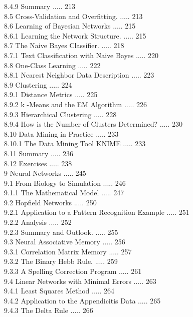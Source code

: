 \documentclass[10pt]{article}
\begin{document}
8.4.9 Summary ..... 213\\
8.5 Cross-Validation and Overfitting. ..... 213\\
8.6 Learning of Bayesian Networks ..... 215\\
8.6.1 Learning the Network Structure. ..... 215\\
8.7 The Naive Bayes Classifier. ..... 218\\
8.7.1 Text Classification with Naive Bayes ..... 220\\
8.8 One-Class Learning ..... 222\\
8.8.1 Nearest Neighbor Data Description ..... 223\\
8.9 Clustering ..... 224\\
8.9.1 Distance Metrics ..... 225\\
8.9.2 k -Means and the EM Algorithm ..... 226\\
8.9.3 Hierarchical Clustering ..... 228\\
8.9.4 How is the Number of Clusters Determined? ..... 230\\
8.10 Data Mining in Practice ..... 233\\
8.10.1 The Data Mining Tool KNIME ..... 233\\
8.11 Summary ..... 236\\
8.12 Exercises ..... 238\\
9 Neural Networks ..... 245\\
9.1 From Biology to Simulation ..... 246\\
9.1.1 The Mathematical Model ..... 247\\
9.2 Hopfield Networks ..... 250\\
9.2.1 Application to a Pattern Recognition Example ..... 251\\
9.2.2 Analysis ..... 252\\
9.2.3 Summary and Outlook. ..... 255\\
9.3 Neural Associative Memory ..... 256\\
9.3.1 Correlation Matrix Memory ..... 257\\
9.3.2 The Binary Hebb Rule. ..... 259\\
9.3.3 A Spelling Correction Program ..... 261\\
9.4 Linear Networks with Minimal Errors ..... 263\\
9.4.1 Least Squares Method ..... 264\\
9.4.2 Application to the Appendicitis Data ..... 265\\
9.4.3 The Delta Rule ..... 266\\
\end{document}
